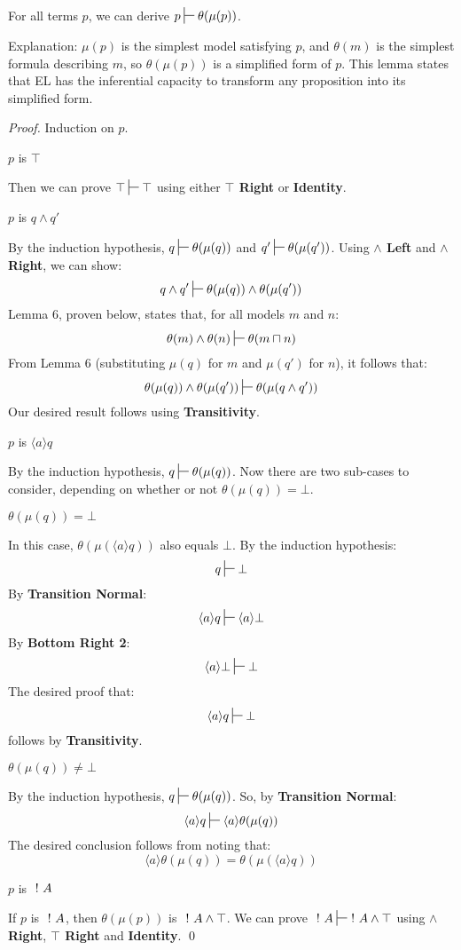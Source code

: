 \begin{lemma}
For all terms $p$, we can derive $p \judge \theta(\mu(p))$.
\end{lemma}
Explanation: $\mu(p)$ is the simplest model satisfying $p$, and $\theta(m)$ is the simplest formula describing $m$, so $\theta(\mu(p))$ is a simplified form of $p$. This lemma states that EL has the inferential capacity to transform any proposition into its simplified form.
\begin{proof}
Induction on $p$.

\setcounter{mycase}{0}

\begin{mycase}
$p$ is $\top$
\end{mycase}
Then we can prove  $\top \judge \top$ using either {\bf $\top$ Right} or {\bf Identity}.

\begin{mycase}
$p$ is $q \land q'$
\end{mycase}
By the induction hypothesis, $q \judge \theta(\mu(q))$ and $q' \judge \theta(\mu(q'))$.
Using {\bf $\land$ Left} and {\bf $\land$ Right}, we can show:
\[
q \land q' \judge \theta(\mu(q)) \land \theta(\mu(q'))
\]
Lemma 6, proven below, states that, for all models $m$ and $n$:
\[
\theta(m) \land \theta(n) \judge \theta (m \sqcap n)
\]
From Lemma 6 (substituting $\mu(q)$ for $m$ and $\mu(q')$ for $n$), it follows that:
\[
\theta(\mu(q)) \land \theta(\mu(q')) \judge \theta(\mu(q \land q'))
\]
Our desired result follows using {\bf Transitivity}.

\begin{mycase}
$p$ is $\langle a \rangle q$
\end{mycase}
By the induction hypothesis, $q \judge \theta(\mu(q))$.
Now there are two sub-cases to consider, depending on whether or not $\theta(\mu(q)) = \bot$.
\begin{subcase}
$\theta(\mu(q)) = \bot$
\end{subcase}
In this case, $\theta(\mu(\langle a \rangle q))$ also equals $\bot$. 
By the induction hypothesis:
\[
q \judge \bot
\]
By {\bf Transition Normal}:
\[
\langle a \rangle q \judge \langle a \rangle \bot
\]
By {\bf Bottom Right 2}:
\[
\langle a \rangle \bot \judge \bot
\]
The desired proof that:
\[
\langle a \rangle q \judge \bot
\]
follows by {\bf Transitivity}.
\begin{subcase}
$\theta(\mu(q)) \neq \bot$
\end{subcase}
By the induction hypothesis, $q \judge \theta(\mu(q))$.
So, by {\bf Transition Normal}:
\[
\langle a \rangle q \judge \langle a \rangle \theta(\mu(q))
\]
The desired conclusion follows from noting that:
\[
 \langle a \rangle \theta(\mu(q)) = \theta(\mu(\langle a \rangle q))
 \]
 \begin{mycase}
$p$ is $\ ! \  A$
\end{mycase}
If $p$ is $\ ! \  A$, then $ \theta(\mu(p))$ is $\ ! \  A \land \top$.
We can prove $\fBang A \judge \fBang A \land \top$ using {\bf $\land$ Right}, {\bf $\top$ Right} and {\bf Identity}.
\qed
\end{proof}

